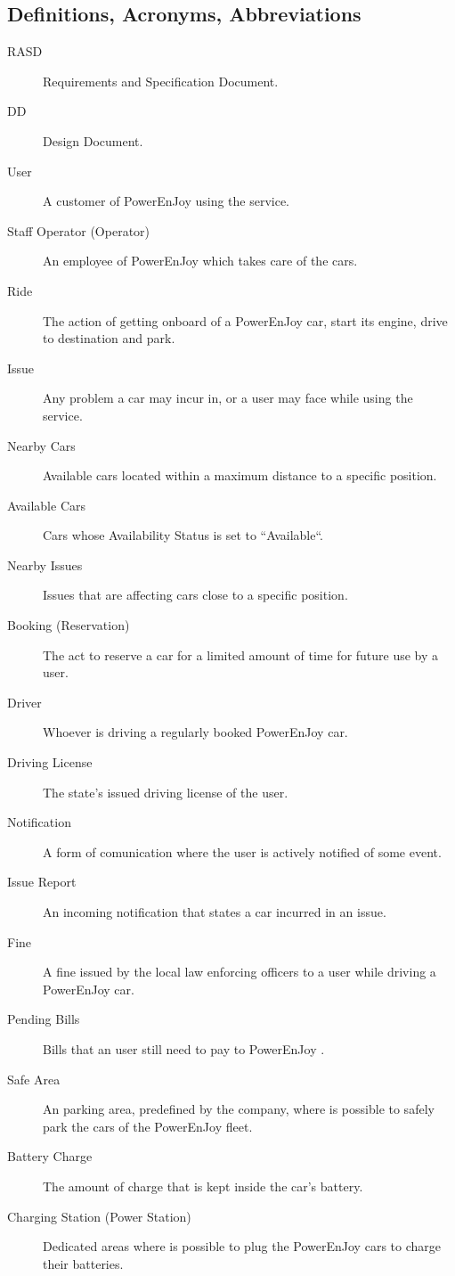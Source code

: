 \documentclass[11pt]{article} %
\newcommand{\pe}{PowerEnJoy }
\begin{document}
\subsection{Definitions, Acronyms, Abbreviations}
 \begin{description}
	\item[RASD] Requirements and Specification Document.
	\item[DD] Design Document.
	\item[User] A customer of \pe using the service.
	\item[Staff Operator (Operator)] An employee of \pe which takes care of the cars.
	\item[Ride] The action of getting onboard of a \pe car, start its engine, drive to destination and park.
	\item[Issue] Any problem a car may incur in, or a user may face while using the service.
	\item[Nearby Cars] Available cars located within a maximum distance to a specific position.
	\item[Available Cars] Cars whose Availability Status is set to ``Available``.
	\item[Nearby Issues] Issues that are affecting cars close to a specific position.
	\item[Booking (Reservation)] The act to reserve a car for a limited amount of time for future use by a user.
	\item[Driver] Whoever is driving a regularly booked \pe car.
	\item[Driving License] The state's issued driving license of the user.
	\item[Notification] A form of comunication where the user is actively notified of some event.
	\item[Issue Report] An incoming notification that states a car incurred in an issue.
	\item[Fine] A fine issued by the local law enforcing officers to a user while driving a \pe car. 
	\item[Pending Bills] Bills that an user still need to pay to \pe.
	\item[Safe Area] An parking area, predefined by the company, where is possible to safely park the cars of the \pe fleet.
	\item[Battery Charge] The amount of charge that is kept inside the car's battery.
	\item[Charging Station (Power Station)] Dedicated areas where is possible to plug the \pe cars to charge their batteries.

\end{description}
\end{document}
